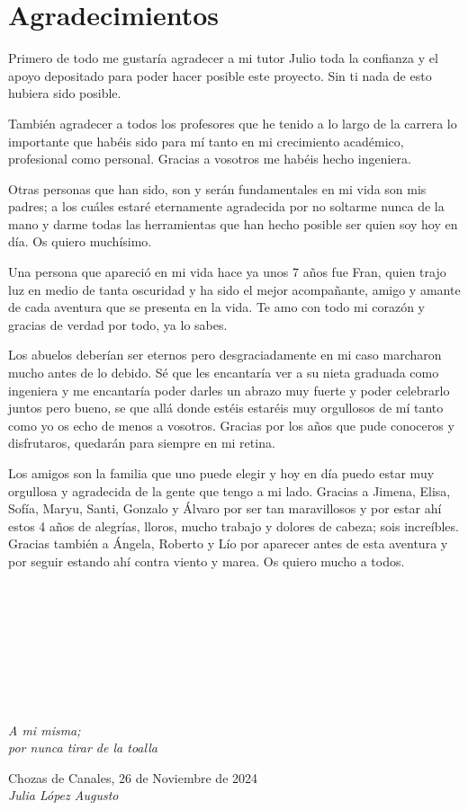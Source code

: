 \cleardoublepage

\chapter*{Agradecimientos}

Primero de todo me gustaría agradecer a mi tutor Julio toda la confianza y el apoyo depositado para poder hacer posible este proyecto. Sin ti nada de esto hubiera sido posible.

También agradecer a todos los profesores que he tenido a lo largo de la carrera lo importante que habéis sido para mí tanto en mi crecimiento académico, profesional como personal. Gracias a vosotros me habéis hecho ingeniera.

Otras personas que han sido, son y serán fundamentales en mi vida son mis padres; a los cuáles estaré eternamente agradecida por no soltarme nunca de la mano y darme todas las herramientas que han hecho posible ser quien soy hoy en día. Os quiero muchísimo.

Una persona que apareció en mi vida hace ya unos 7 años fue Fran, quien trajo luz en medio de tanta oscuridad y ha sido el mejor acompañante, amigo y amante de cada aventura que se presenta en la vida. Te amo con todo mi corazón y gracias de verdad por todo, ya lo sabes.

Los abuelos deberían ser eternos pero desgraciadamente en mi caso marcharon mucho antes de lo debido. Sé que les encantaría ver a su nieta graduada como ingeniera y me encantaría poder darles un abrazo muy fuerte y poder celebrarlo juntos pero bueno, se que allá donde estéis estaréis muy orgullosos de mí tanto como yo os echo de menos a vosotros. Gracias por los años que pude conoceros y disfrutaros, quedarán para siempre en mi retina. 

Los amigos son la familia que uno puede elegir y hoy en día puedo estar muy orgullosa y agradecida de la gente que tengo a mi lado. Gracias a Jimena, Elisa, Sofía, Maryu, Santi, Gonzalo y Álvaro por ser tan maravillosos y por estar ahí estos 4 años de alegrías, lloros, mucho trabajo y dolores de cabeza; sois increíbles. Gracias también a Ángela, Roberto y Lío por aparecer antes de esta aventura y por seguir estando ahí contra viento y marea. Os quiero mucho a todos. \\
\ %

\

\

\

\

\begin{flushright}
		\vspace{4.0 cm}
		\emph{A mi misma;\\
      por nunca tirar de la toalla}\\
		\par
		\vspace{1.0 cm}
		Chozas de Canales, 26 de Noviembre de 2024\\ %
		\emph{Julia López Augusto}
\end{flushright}

\thispagestyle{empty}

